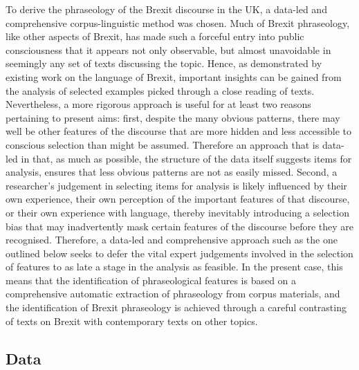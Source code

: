 \documentclass[output=paper]{langscibook}
\begin{document}
To derive the phraseology of the Brexit discourse in the UK, a data-led and comprehensive corpus-linguistic method was chosen. Much of Brexit phraseology, like other aspects of Brexit, has made such a forceful entry into public consciousness that it appears not only observable, but almost unavoidable in seemingly any set of texts discussing the topic. Hence, as demonstrated by existing work on the language of Brexit, important insights can be gained from the analysis of selected examples picked through a close reading of texts. Nevertheless, a more rigorous approach is useful for at least two reasons pertaining to present aims: first, despite the many obvious patterns, there may well be other features of the discourse that are more hidden and less accessible to conscious selection than might be assumed. Therefore an approach that is data-led in that, as much as possible, the structure of the data itself suggests items for analysis, ensures that less obvious patterns are not as easily missed. Second, a researcher’s judgement in selecting items for analysis is likely influenced by their own experience, their own perception of the important features of that discourse, or their own experience with language, thereby inevitably introducing a selection bias that may inadvertently mask certain features of the discourse before they are recognised. Therefore, a data-led and comprehensive approach such as the one outlined below seeks to defer the vital expert judgements involved in the selection of features to as late a stage in the analysis as feasible. In the present case, this means that the identification of phraseological features is based on a comprehensive automatic extraction of phraseology from corpus materials, and the identification of Brexit phraseology is achieved through a careful contrasting of texts on Brexit with contemporary texts on other topics.

\subsection{Data}
\end{document}
